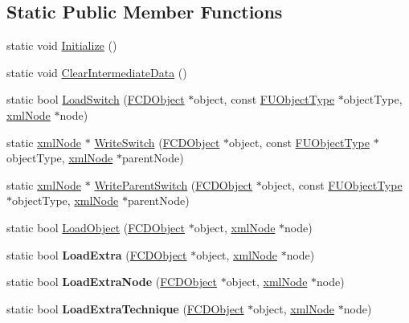 \subsection*{Static Public Member Functions}
\begin{DoxyCompactItemize}
\item 
static void \hyperlink{classFArchiveXML_a9058483d29253567c3bbaa9e557e38b1}{Initialize} ()
\item 
static void \hyperlink{classFArchiveXML_ad9be9f3803f77996d7b155f2110a7105}{ClearIntermediateData} ()
\item 
static bool \hyperlink{classFArchiveXML_a6cc3fc2e4e1415c3c411a38f978c77ae}{LoadSwitch} (\hyperlink{classFCDObject}{FCDObject} $\ast$object, const \hyperlink{classFUObjectType}{FUObjectType} $\ast$objectType, \hyperlink{struct__xmlNode}{xmlNode} $\ast$node)
\item 
static \hyperlink{struct__xmlNode}{xmlNode} $\ast$ \hyperlink{classFArchiveXML_aaf83155ae7183ba1b4b485fdd239c483}{WriteSwitch} (\hyperlink{classFCDObject}{FCDObject} $\ast$object, const \hyperlink{classFUObjectType}{FUObjectType} $\ast$objectType, \hyperlink{struct__xmlNode}{xmlNode} $\ast$parentNode)
\item 
static \hyperlink{struct__xmlNode}{xmlNode} $\ast$ \hyperlink{classFArchiveXML_a2b455f62993fdcc77200439fb917748e}{WriteParentSwitch} (\hyperlink{classFCDObject}{FCDObject} $\ast$object, const \hyperlink{classFUObjectType}{FUObjectType} $\ast$objectType, \hyperlink{struct__xmlNode}{xmlNode} $\ast$parentNode)
\item 
static bool \hyperlink{classFArchiveXML_a262d6014344ef77f716e08e4149d4c16}{LoadObject} (\hyperlink{classFCDObject}{FCDObject} $\ast$object, \hyperlink{struct__xmlNode}{xmlNode} $\ast$node)
\item 
\hypertarget{classFArchiveXML_a1b7970ad7bb676ad4589adc156d0f49c}{
static bool {\bfseries LoadExtra} (\hyperlink{classFCDObject}{FCDObject} $\ast$object, \hyperlink{struct__xmlNode}{xmlNode} $\ast$node)}
\label{classFArchiveXML_a1b7970ad7bb676ad4589adc156d0f49c}

\item 
\hypertarget{classFArchiveXML_a535909ab9a6ad15b14db6a0496d505e6}{
static bool {\bfseries LoadExtraNode} (\hyperlink{classFCDObject}{FCDObject} $\ast$object, \hyperlink{struct__xmlNode}{xmlNode} $\ast$node)}
\label{classFArchiveXML_a535909ab9a6ad15b14db6a0496d505e6}

\item 
\hypertarget{classFArchiveXML_a53dcee9d989ad31d7b18c5a993988421}{
static bool {\bfseries LoadExtraTechnique} (\hyperlink{classFCDObject}{FCDObject} $\ast$object, \hyperlink{struct__xmlNode}{xmlNode} $\ast$node)}
\label{classFArchiveXML_a53dcee9d989ad31d7b18c5a993988421}


\end{DoxyCompactItemize}
